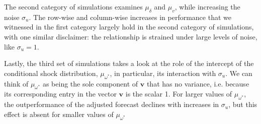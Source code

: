 \documentclass{uiucthesis2021}
\newcommand{\x}{\textbf{v}}
\theoremstyle{definition}
\begin{document}
The second category of simulations examines $\mu_{\delta}$ and $\mu_{v}$, while increasing the noise $\sigma_{u}$.  The row-wise and column-wise increases in performance that we witnessed in the first category largely hold in the second category of simulations, with one similar disclaimer: the relationship is strained under large levels of noise, like $\sigma_{u} = 1$.

Lastly, the third set of simulations takes a look at the role of the intercept of the conditional shock distribution, $\mu_{\omega^{*}}$, in particular, its interaction with $\sigma_{u}$.  We can think of $\mu_{\omega^{*}}$ as being the sole component of $\x$ that has no variance, i.e. because its corresponding entry in the vector $\x$ is the scalar 1.  For larger values of $\mu_{\omega^{*}}$, the outperformance of the adjusted forecast declines with increases in $\sigma_{u}$, but this effect is absent for smaller values of $\mu_{\omega^{*}}$ 
\end{document}
